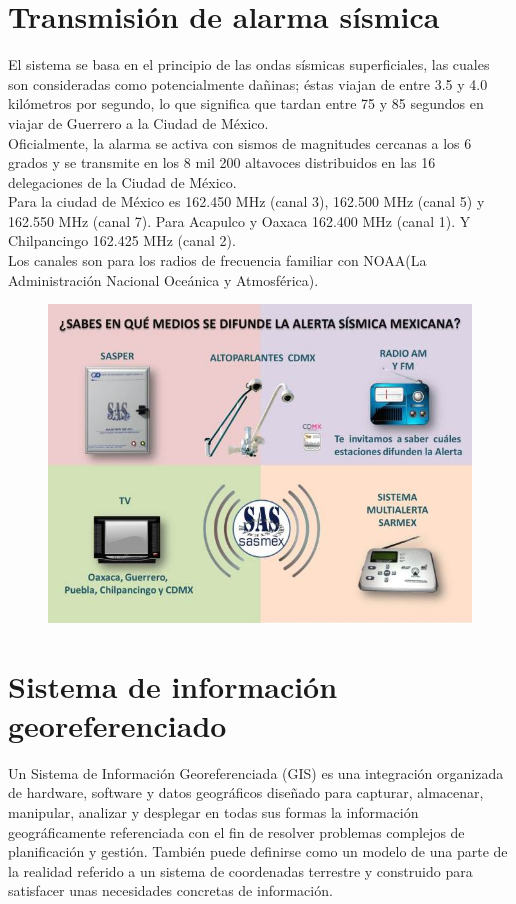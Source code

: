 \section{Transmisión de alarma sísmica}
El sistema se basa en el principio de las ondas sísmicas superficiales, las cuales son consideradas como potencialmente dañinas; éstas viajan de entre 3.5 y 4.0 kilómetros por segundo, lo que significa que tardan entre 75 y 85 segundos en viajar de Guerrero a la Ciudad de México.\\Oficialmente, la alarma se activa con sismos de magnitudes cercanas a los 6 grados y se transmite en los 8 mil 200 altavoces distribuidos en las 16 delegaciones de la Ciudad de México. \\
Para la ciudad de México es 162.450 MHz (canal 3), 162.500 MHz (canal 5) y 162.550 MHz (canal 7).
Para Acapulco y Oaxaca 162.400 MHz (canal 1).
Y Chilpancingo 162.425 MHz (canal 2).\\Los canales son para los radios de frecuencia familiar con NOAA(La Administración Nacional Oceánica y Atmosférica).
\begin{figure}[htbp]
	\begin{center}
		\includegraphics[width=.4\textwidth]{images/imgmarco/transmision}
		\label{fig:transmision}
	\end{center}
\end{figure}

\section{Sistema de información georeferenciado}
Un Sistema de Información Georeferenciada (GIS) es una integración organizada de hardware, software y datos geográficos diseñado para capturar, almacenar, manipular, analizar y desplegar en todas sus formas la información geográficamente referenciada con el fin de resolver problemas complejos de planificación y gestión. También puede definirse como un modelo de una parte de la realidad referido a un sistema de coordenadas terrestre y construido para satisfacer unas necesidades concretas de información.

